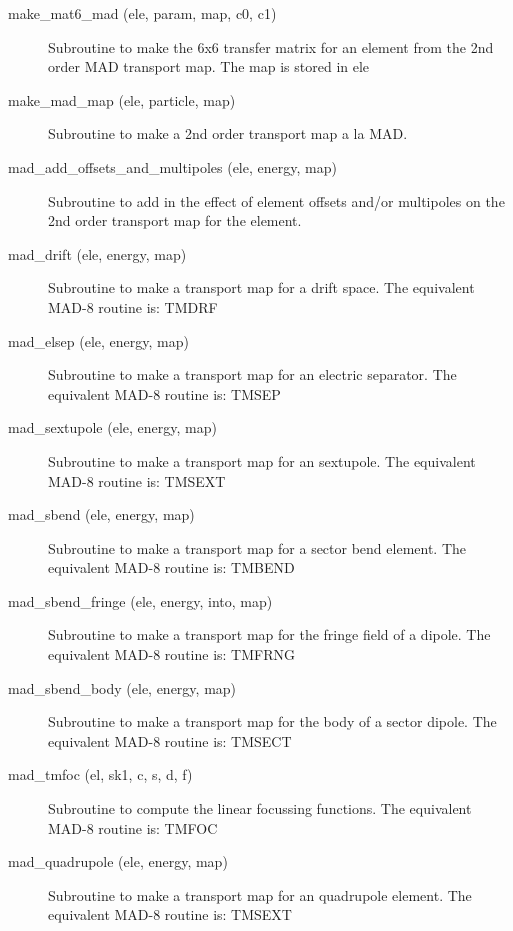 \begin{description}

\item[make\_mat6\_mad (ele, param, map, c0, c1)] \Newline 
     Subroutine to make the 6x6 transfer matrix for an element from the 
     2nd order MAD transport map. The map is stored in ele%

\item[make\_mad\_map (ele, particle, map)] \Newline 
     Subroutine to make a 2nd order transport map a la MAD.

\item[mad\_add\_offsets\_and\_multipoles (ele, energy, map)] \Newline 
     Subroutine to add in the effect of element offsets and/or multipoles
     on the 2nd order transport map for the element.

\item[mad\_drift (ele, energy, map)] \Newline 
     Subroutine to make a transport map for a drift space.
     The equivalent MAD-8 routine is: TMDRF

\item[mad\_elsep (ele, energy, map)] \Newline 
     Subroutine to make a transport map for an electric separator. 
     The equivalent MAD-8 routine is: TMSEP

\item[mad\_sextupole (ele, energy, map)] \Newline 
     Subroutine to make a transport map for an sextupole.
     The equivalent MAD-8 routine is: TMSEXT

\item[mad\_sbend (ele, energy, map)] \Newline 
     Subroutine to make a transport map for a sector bend element.
     The equivalent MAD-8 routine is: TMBEND

\item[mad\_sbend\_fringe (ele, energy, into, map)] \Newline 
     Subroutine to make a transport map for the fringe field of a dipole.
     The equivalent MAD-8 routine is: TMFRNG

\item[mad\_sbend\_body (ele, energy, map)] \Newline 
     Subroutine to make a transport map for the body of a sector dipole.
     The equivalent MAD-8 routine is: TMSECT

\item[mad\_tmfoc (el, sk1, c, s, d, f) ] \Newline 
     Subroutine to compute the linear focussing functions.  
     The equivalent MAD-8 routine is: TMFOC

\item[mad\_quadrupole (ele, energy, map)] \Newline 
     Subroutine to make a transport map for an quadrupole element.
     The equivalent MAD-8 routine is: TMSEXT


\end{description}
